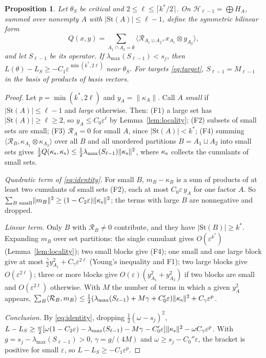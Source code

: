 \documentclass[11pt]{article}
\newtheorem{proposition}{Proposition}
\theoremstyle{definition}
\newcommand{\St}{\mathrm{St}}
\newcommand{\ip}[2]{\langle #1,#2\rangle}
\begin{document}
\begin{proposition}\label{prop:lower}
Let $\theta_S$ be critical and $2\le\ell\le\lceil k^*/2\rceil$. On $\mathcal H_{\ell-1}=\bigoplus H_A$, summed over nonempty $A$ with
$\lvert\St(A)\rvert\le\ell-1$, define the symmetric bilinear form
\[
Q(x,y)=\sum_{A_1\cap A_2=\emptyset}\ip{\mathcal R_{A_1\sqcup A_2}}{x_{A_1}\otimes y_{A_2}},
\]
and let $S_{\ell-1}$ be its operator. If $\lambda_{\max}(S_{\ell-1})<s_j$, then $L(\theta)-L_S\ge-C_1\varepsilon^{\min(k^*,2\ell)}$ near
$\theta_S$. For targets \eqref{eq:target}, $S_{\ell-1}=M_{\ell-1}$ in the basis of products of basis vectors.
\end{proposition}
\begin{proof}
Let $p=\min(k^*,2\ell)$ and $y_A=\lVert\kappa_A\rVert$. Call $A$ \emph{small} if $\lvert\St(A)\rvert\le\ell-1$ and \emph{large}
otherwise. Then: (F1) a large set has $\lvert\St(A)\rvert\ge\ell\ge2$, so $y_A\le C_0\varepsilon^\ell$ by Lemma~\ref{lem:locality};
(F2) subsets of small sets are small; (F3) $\mathcal R_A=0$ for small $A$, since $\lvert\St(A)\rvert<k^*$; (F4) summing
$\ip{\mathcal R_B}{\kappa_{A_1}\otimes\kappa_{A_2}}$ over all $B$ and all unordered partitions $B=A_1\sqcup A_2$ into small sets gives
$\frac12Q(\kappa_{\rm s},\kappa_{\rm s})\le\frac12\lambda_{\max}(S_{\ell-1})\lVert\kappa_{\rm s}\rVert^2$, where $\kappa_{\rm s}$ collects the
cumulants of small sets.

\emph{Quadratic term of \eqref{eq:identity}.} For small $B$, $m_B-\kappa_B$ is a sum of products of at least two cumulants of
small sets (F2), each at most $C_0\varepsilon\,y_A$ for one factor $A$. So
$\sum_{B\text{ small}}\lVert m_B\rVert^2\ge(1-C_2\varepsilon)\lVert\kappa_{\rm s}\rVert^2$; the terms with large $B$ are nonnegative and dropped.

\emph{Linear term.} Only $B$ with $\mathcal R_B\ne0$ contribute, and they have $\lvert\St(B)\rvert\ge k^*$. Expanding $m_B$ over set
partitions: the single cumulant gives $O(\varepsilon^{k^*})$ (Lemma~\ref{lem:locality}); two small blocks give (F4); one small and
one large block give at most $\frac\gamma2y_{A_1}^2+C_\gamma\varepsilon^{2\ell}$ (Young's inequality and F1); two large blocks give
$O(\varepsilon^{2\ell})$; three or more blocks give $O(\varepsilon)(y_{A_1}^2+y_{A_2}^2)$ if two blocks are small and $O(\varepsilon^{2\ell})$ otherwise.
With $M$ the number of terms in which a given $y_A^2$ appears,
$\sum_B\ip{\mathcal R_B}{m_B}\le\frac12(\lambda_{\max}(S_{\ell-1})+M\gamma+C_0'\varepsilon)\lVert\kappa_{\rm s}\rVert^2+C_\gamma\varepsilon^p$.

\emph{Conclusion.} By \eqref{eq:identity}, dropping $\frac12(\omega-s_j)^2$,
$L-L_S\ge\frac\omega2[\omega(1-C_2\varepsilon)-\lambda_{\max}(S_{\ell-1})-M\gamma-C_0'\varepsilon]\lVert\kappa_{\rm s}\rVert^2-\omega C_\gamma\varepsilon^p$.
With $g=s_j-\lambda_{\max}(S_{\ell-1})>0$, $\gamma=g/(4M)$ and $\omega\ge s_j-C_0''\varepsilon$, the bracket is positive for small $\varepsilon$,
so $L-L_S\ge-C_1\varepsilon^p$.
\end{proof}
\end{document}
